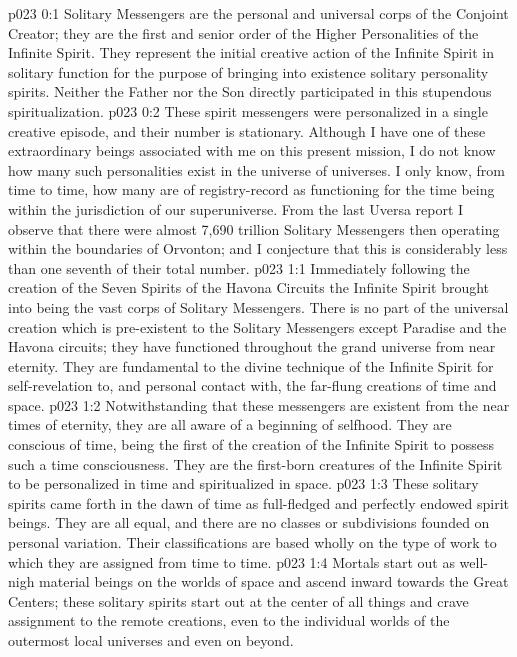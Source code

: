 \author{Divine Counselor}
\vs p023 0:1 Solitary Messengers are the personal and universal corps of the Conjoint Creator; they are the first and senior order of the Higher Personalities of the Infinite Spirit. They represent the initial creative action of the Infinite Spirit in solitary function for the purpose of bringing into existence solitary personality spirits. Neither the Father nor the Son directly participated in this stupendous spiritualization.
\vs p023 0:2 These spirit messengers were personalized in a single creative episode, and their number is stationary. Although I have one of these extraordinary beings associated with me on this present mission, I do not know how many such personalities exist in the universe of universes. I only know, from time to time, how many are of registry\hyp{}record as functioning for the time being within the jurisdiction of our superuniverse. From the last Uversa report I observe that there were almost 7,690 trillion Solitary Messengers then operating within the boundaries of Orvonton; and I conjecture that this is considerably less than one seventh of their total number.\plusone
{}
\vs p023 1:1 Immediately following the creation of the Seven Spirits of the Havona Circuits the Infinite Spirit brought into being the vast corps of Solitary Messengers. There is no part of the universal creation which is pre\hyp{}existent to the Solitary Messengers except Paradise and the Havona circuits; they have functioned throughout the grand universe from near eternity. They are fundamental to the divine technique of the Infinite Spirit for self\hyp{}revelation to, and personal contact with, the far\hyp{}flung creations of time and space.
\vs p023 1:2 Notwithstanding that these messengers are existent from the near times of eternity, they are all aware of a beginning of selfhood. They are conscious of time, being the first of the creation of the Infinite Spirit to possess such a time consciousness. They are the first\hyp{}born creatures of the Infinite Spirit to be personalized in time and spiritualized in space.
\vs p023 1:3 These solitary spirits came forth in the dawn of time as full\hyp{}fledged and perfectly endowed spirit beings. They are all equal, and there are no classes or subdivisions founded on personal variation. Their classifications are based wholly on the type of work to which they are assigned from time to time.
\vs p023 1:4 Mortals start out as well\hyp{}nigh material beings on the worlds of space and ascend inward towards the Great Centers; these solitary spirits start out at the center of all things and crave assignment to the remote creations, even to the individual worlds of the outermost local universes and even on beyond.
